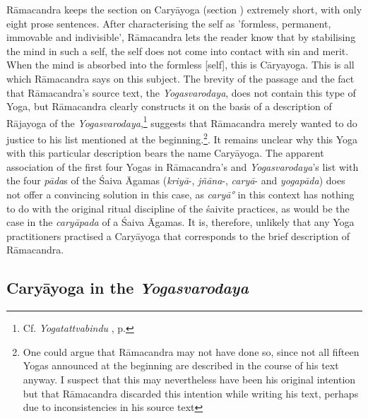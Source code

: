Rāmacandra keeps the section on Caryāyoga (section ) extremely short, with only eight prose sentences. After characterising the self as 'formless, permanent, immovable and indivisible', Rāmacandra lets the reader know that by stabilising the mind in such a self, the self does not come into contact with sin and merit. When the mind is absorbed into the formless [self], this is Cāryayoga. This is all which Rāmacandra says on this subject. The brevity of the passage and the fact that Rāmacandra's source text, the \textit{Yogasvarodaya}, does not contain this type of Yoga, but Rāmacandra clearly constructs it on the basis of a description of Rājayoga of the \textit{Yogasvarodaya},\footnote{Cf. \textit{Yogatattvabindu} , p. \pageref{caryayoga}} suggests that Rāmacandra merely wanted to do justice to his list mentioned at the beginning.\footnote{One could argue that Rāmacandra may not have done so, since not all fifteen Yogas announced at the beginning are described in the course of his text anyway. I suspect that this may nevertheless have been his original intention but that Rāmacandra discarded this intention while writing his text, perhaps due to inconsistencies in his source text}. It remains unclear why this Yoga with this particular description bears the name Caryāyoga. The apparent association of the first four Yogas in Rāmacandra's and \textit{Yogasvarodaya}'s list with the four \textit{pāda}s of the Śaiva Āgamas (\textit{kriyā}-, \textit{jñāna}-, \textit{caryā}- and \textit{yogapāda}) does not offer a convincing solution in this case, as \textit{caryā°} in this context has nothing to do with the original ritual discipline of the śaivite practices, as would be the case in the \textit{caryāpada} of a Śaiva Āgamas. It is, therefore, unlikely that any Yoga practitioners practised a Caryāyoga that corresponds to the brief description of Rāmacandra. 

\subsection{Caryāyoga in the \textit{Yogasvarodaya}}


